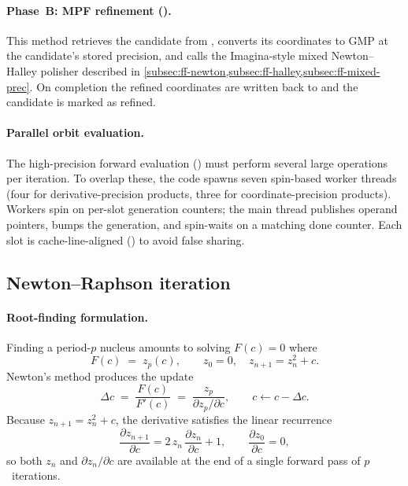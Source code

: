 \paragraph{Phase~B: MPF refinement ().}
This method retrieves the candidate from , converts
its coordinates to GMP  at the candidate's stored precision,
and calls the Imagina-style mixed Newton--Halley polisher described in
\cref{subsec:ff-newton,subsec:ff-halley,subsec:ff-mixed-prec}.  On
completion the refined coordinates are written back to 
and the candidate is marked as refined.

\paragraph{Parallel orbit evaluation.}
The high-precision forward evaluation
() must perform several large
 operations per iteration.  To overlap these, the code spawns
seven spin-based worker threads (four for derivative-precision products,
three for coordinate-precision products).  Workers spin on per-slot
 generation counters;
the main thread
publishes operand pointers, bumps the generation, and spin-waits on a
matching done counter.  Each slot is cache-line-aligned ()
to avoid false sharing.

\subsection{Newton--Raphson iteration}
\label{subsec:ff-newton}

\paragraph{Root-finding formulation.}
Finding a period-$p$ nucleus amounts to solving $F(c)=0$ where
\begin{equation}\label{eq:ff-Fc}
F(c) \;=\; z_p(c),\qquad
z_0 = 0,\quad z_{n+1} = z_n^2 + c.
\end{equation}
Newton's method produces the update
\begin{equation}\label{eq:ff-newton-step}
\Delta c \;=\; \frac{F(c)}{F'(c)}
         \;=\; \frac{z_p}{\partial z_p / \partial c},
\qquad c \leftarrow c - \Delta c.
\end{equation}
Because $z_{n+1}=z_n^2+c$, the derivative satisfies the linear recurrence
\begin{equation}\label{eq:ff-dzdc-recurrence}
\frac{\partial z_{n+1}}{\partial c}
  = 2\,z_n\,\frac{\partial z_n}{\partial c} + 1,
\qquad \frac{\partial z_0}{\partial c} = 0,
\end{equation}
so both $z_n$ and $\partial z_n/\partial c$ are available at the end of a
single forward pass of $p$~iterations.

